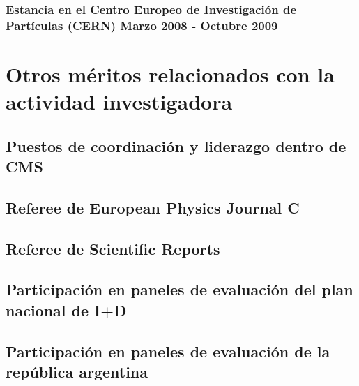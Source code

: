 \documentclass[a4paper, 11pt, twoside, openright]{report}
\begin{document}
\subsubsection{Estancia en el Centro Europeo de Investigación de Partículas (CERN) Marzo 2008 - Octubre 2009}



\section{Otros méritos relacionados con la actividad investigadora}

\subsection{Puestos de coordinación y liderazgo dentro de CMS}



\subsection{Referee de European Physics Journal C}



\subsection{Referee de Scientific Reports}


\subsection{Participación en paneles de evaluación del plan nacional de I+D}


\subsection{Participación en paneles de evaluación de la república argentina}

\end{document}
